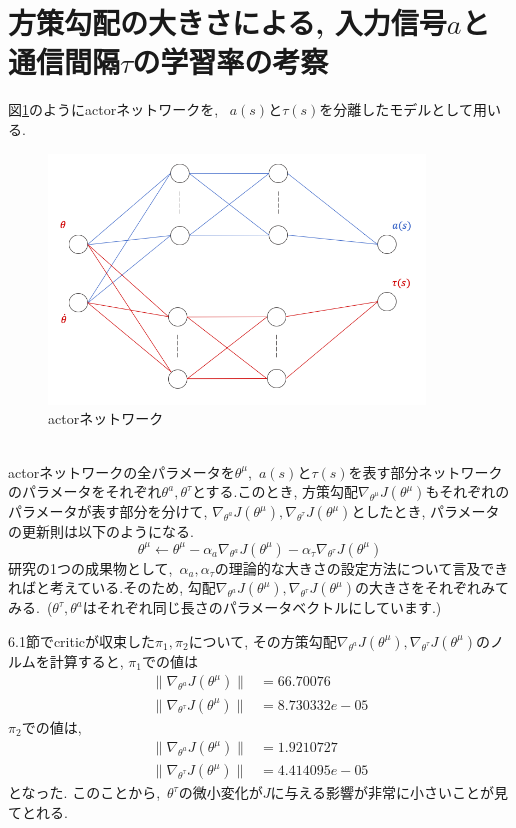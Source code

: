 \documentclass{jsarticle}
\begin{document}
\section{方策勾配の大きさによる, 入力信号$a$と通信間隔$\tau$の学習率の考察}
図\ref{split_NN}のようにactorネットワークを, ~$a(s)$と$\tau(s)$を分離したモデルとして用いる. 
\begin{figure}[h]
	\centering
 	\includegraphics[width=10cm]{split_NN.png}
 	\caption{actorネットワーク} \label{split_NN}
\end{figure}\\
actorネットワークの全パラメータを$\theta^{\mu}$,~$a(s)$と$\tau(s)$を表す部分ネットワークのパラメータをそれぞれ$\theta^a, \theta^{\tau}$とする.このとき, 方策勾配$\nabla_{\theta^{\mu}}J(\theta^{\mu})$もそれぞれのパラメータが表す部分を分けて, $\nabla_{\theta^a}J(\theta^{\mu}), \nabla_{\theta^{\tau}}J(\theta^{\mu})$としたとき, パラメータの更新則は以下のようになる.
\begin{equation}
	\theta^{\mu}\gets \theta^{\mu} - \alpha_a\nabla_{\theta^a}J(\theta^{\mu}) - \alpha_{\tau}\nabla_{\theta^{\tau}}J(\theta^{\mu})
\end{equation}
研究の1つの成果物として,~$\alpha_a, \alpha_{\tau}$の理論的な大きさの設定方法について言及できればと考えている.そのため, 勾配$\nabla_{\theta^a}J(\theta^{\mu}), \nabla_{\theta^{\tau}}J(\theta^{\mu})$の大きさをそれぞれみてみる.~($\theta^{\tau}, \theta^{a}$はそれぞれ同じ長さのパラメータベクトルにしています.)\par
6.1節でcriticが収束した$\pi_1, \pi_2$について, その方策勾配$\nabla_{\theta^a}J(\theta^{\mu}), \nabla_{\theta^{\tau}}J(\theta^{\mu})$のノルムを計算すると, $\pi_1$での値は
\begin{align}
	\|\nabla_{\theta^a}J(\theta^{\mu})\| &= 66.70076 \\
	\|\nabla_{\theta^{\tau}}J(\theta^{\mu})\| &= 8.730332e-05
\end{align}
$\pi_2$での値は,
\begin{align}
	\|\nabla_{\theta^a}J(\theta^{\mu})\| &= 1.9210727 \\
	\|\nabla_{\theta^{\tau}}J(\theta^{\mu})\| &= 4.414095e-05
\end{align}
となった. このことから,~$\theta^{\tau}$の微小変化が$J$に与える影響が非常に小さいことが見てとれる. \par
\end{document}
